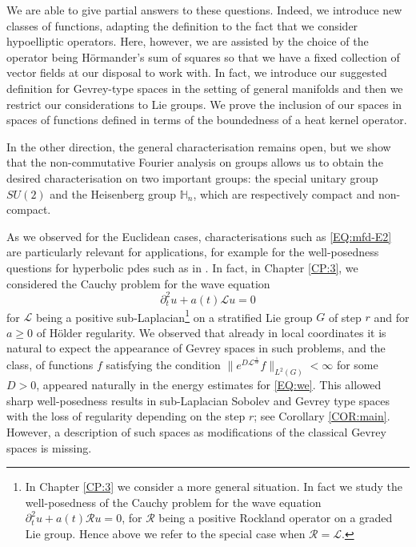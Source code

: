 \documentclass[12pt,oneside,a4paper]{book}
\numberwithin{equation}{section}     %
\theoremstyle{plain}
\theoremstyle{definition}
\newcommand{\h}{{\mathbb H}}
\newcommand{\slp}{{\mathcal L}}
\begin{document}
We are able to give partial answers to these questions.  
Indeed, we introduce new classes of functions, adapting the definition to the fact that we consider hypoelliptic operators. Here, however, we are assisted by the choice of the operator being H\"ormander's sum of squares so that we have a fixed collection of  vector fields at our disposal to work with. In fact, we introduce our suggested definition for Gevrey-type spaces in the setting of general manifolds and then we restrict our considerations to Lie groups. We prove the inclusion of our spaces in spaces of functions defined in terms of the boundedness of a heat kernel operator.

In the other direction, the general characterisation remains open, but we show that the non-commutative Fourier analysis on groups allows us to obtain the desired characterisation on two important groups: the special unitary group $SU(2)$ and the Heisenberg group $\h_n$, which are respectively compact and non-compact.

As we observed for the Euclidean cases, characterisations such as \eqref{EQ:mfd-E2} are particularly relevant for applications, for example for the well-posedness questions for hyperbolic pdes such as in \cite{CDS79}. In fact, in Chapter \ref{CP:3}, we considered the Cauchy problem for the wave equation
\begin{equation}\label{EQ:we}
\partial_t^2 u+a(t)\slp u=0
\end{equation}
for $\slp$ being a positive sub-Laplacian\footnote{In Chapter \ref{CP:3} we consider a more general situation. In fact we study the well-posedness of the Cauchy problem for the wave equation $\partial_t^2 u+a(t)\mathcal{R} u=0$, for $\mathcal{R}$ being a positive Rockland operator on a graded Lie group. Hence above we refer to the special case when $\mathcal{R}=\slp$.} on a stratified Lie group $G$ of step $r$ and for $a\geq 0$ of H\"older regularity. We observed that already in local coordinates it is natural to expect the appearance of Gevrey spaces in such problems, and the class, of functions $f$ satisfying the condition $\| e^{D \slp^{\frac{1}{s\nu}}} f\|_{L^2(G)}<\infty$ for some $D>0$, appeared naturally in the energy estimates for \eqref{EQ:we}. This allowed sharp well-posedness results in sub-Laplacian Sobolev and Gevrey type spaces with the loss of regularity depending on the step $r$; see Corollary \ref{COR:main}. However, a description of such spaces as modifications of the classical Gevrey spaces is missing. 
\end{document}
